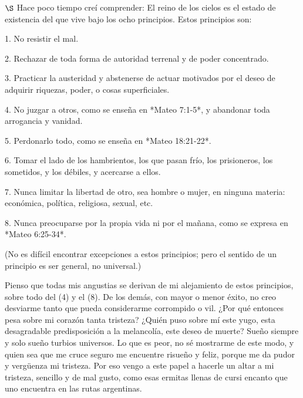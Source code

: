\documentclass[a4paper, 12pt]{article}
\begin{document}
\newpage


\newpage 

$\S$ Hace poco tiempo creí comprender: El reino de los cielos es el estado de
existencia del que vive bajo los ocho principios. Estos principios son: 

1. No resistir el mal.

2. Rechazar de toda forma de autoridad terrenal y de poder concentrado.

3. Practicar la austeridad y abstenerse de actuar motivados por el deseo de
adquirir riquezas, poder, o cosas superficiales.

4. No juzgar a otros, como se enseña en *Mateo 7:1-5*, y abandonar toda
arrogancia y vanidad.

5. Perdonarlo todo, como se enseña en *Mateo 18:21-22*. 

6. Tomar el lado de los hambrientos, los que pasan frío, los prisioneros, los
sometidos, y los débiles, y acercarse a ellos.

7. Nunca limitar la libertad de otro, sea hombre o mujer, en ninguna materia:
económica, política, religiosa, sexual, etc.

8. Nunca preocuparse por la propia vida ni por el mañana, como se expresa en
*Mateo 6:25-34*.


(No es difícil encontrar excepciones a estos principios; pero el sentido de un
principio es ser general, no universal.)

Pienso que todas mis angustias se derivan de mi alejamiento de estos principios,
sobre todo del (4) y el (8). De los demás, con mayor o menor éxito, no creo
desviarme tanto que pueda considerarme corrompido o vil. ¿Por qué entonces pesa
sobre mi corazón tanta tristeza? ¿Quién puso sobre mí este yugo, esta
desagradable predisposición a la melancolía, este deseo de muerte? Sueño siempre
y solo sueño turbios universos. Lo que es peor, no sé mostrarme de este modo, y
quien sea que me cruce seguro me encuentre risueño y feliz, porque me da pudor y
vergüenza mi tristeza. Por eso vengo a este papel a hacerle un altar a mi
tristeza, sencillo y de mal gusto, como esas ermitas llenas de cursi encanto que
uno encuentra en las rutas argentinas. 

\newpage 
\end{document}
